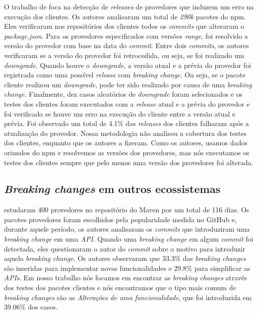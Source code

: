 O trabalho de  foca na detecção de \textit{releases} de provedores que induzem um erro na execução dos clientes. Os autores analisaram um total de \textit{290k} pacotes do \textsf{npm}. Eles verificaram nos repositórios dos clientes todos os \textit{commits} que alteraram o \textit{package.json}. Para os provedores especificados com versões \textit{range}, foi resolvido a versão do provedor com base na data do \textit{commit}. Entre dois \textit{commits}, os autores verificaram se a versão do provedor foi retrocedida, ou seja, se foi realizado um \textit{downgrade}. Quando houve o \textit{downgrade}, a versão atual e a prévia do provedor foi registrada como uma possível \textit{release} com \textit{breaking change}. Ou seja, se o pacote cliente realizou um \textit{downgrade}, pode ter sido realizado por causa de uma \textit{breaking change}. Finalmente, dez casos aleatórios de \textit{downgrade} foram selecionados e os testes dos clientes foram executados com a \textit{release} atual e a prévia do provedor e foi verificado se houve um erro na execução do cliente entre a versão atual e prévia. Foi observado um total de 4.1\% das \textit{releases} dos clientes falharam após a atualização do provedor. Nossa metodologia não analisou a cobertura dos testes dos clientes, enquanto que os autores a fizeram. Como os autores, usamos dados oriundos do \textsf{npm} e resolvemos as versões dos provedores, mas nós executamos os testes dos clientes sempre que pelo menos uma versão dos provedores foi alterada.

\subsection{\textit{Breaking changes} em outros ecossistemas}
\label{sub:related:others}
 estudaram 400 provedores no repositório do \textsf{Maven} por um total de 116 dias. Os pacotes provedores foram escolhidos pela popularidade medida no \textsf{GitHub} e, durante aquele período, os autores analisaram os \textit{commits} que introduziram uma \textit{breaking change} em uma \textit{API}. Quando uma \textit{breaking change} em algum \textit{commit} foi detectada, eles questionaram o autor do \textit{commit} sobre o motivo para introduzir aquela \textit{breaking change}. Os autores observaram que 33.3\% das \textit{breaking changes} são inseridas para implementar novas funcionalidades e 29.8\% para simplificar as \textit{APIs}. Em nosso trabalho nós focamos em encontrar as \textit{breaking changes} através dos testes dos pacotes clientes e nós encontramos que o tipo mais comum de \textit{breaking changes} são as \textit{Alterações de uma funcionalidade}, que foi introduzida em 39.06\% dos casos.

